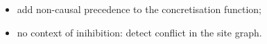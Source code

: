 \begin{mdframed}[backgroundcolor=blue!20]
  \begin{itemize}
  \item add non-causal precedence to the concretisation function;
  \item no context of inihibition: detect conflict in the site graph.
  \end{itemize}
\end{mdframed}

